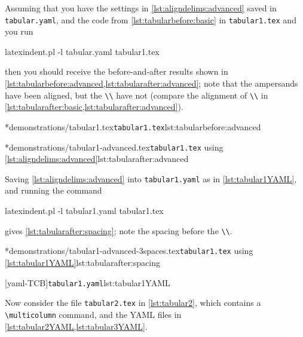 	Assuming that you have the settings in \cref{lst:aligndelims:advanced} saved in \texttt{tabular.yaml}, and the code from \cref{lst:tabularbefore:basic} in \texttt{tabular1.tex} and you run \begin{commandshell}
latexindent.pl -l tabular.yaml tabular1.tex 
\end{commandshell} then you should receive the before-and-after results shown in \cref{lst:tabularbefore:advanced,lst:tabularafter:advanced}; note that the ampersands have been aligned, but the \lstinline!\\! have not (compare the alignment of \lstinline!\\! in \cref{lst:tabularafter:basic,lst:tabularafter:advanced}).

	\begin{minipage}{.45\textwidth}
		\cmhlistingsfromfile[showspaces=false,showtabs=false]*{demonstrations/tabular1.tex}{\texttt{tabular1.tex}}{lst:tabularbefore:advanced}
	\end{minipage}%
	\hfill
	\begin{minipage}{.45\textwidth}
		\cmhlistingsfromfile[showspaces=false,showtabs=false]*{demonstrations/tabular1-advanced.tex}{\texttt{tabular1.tex} using \cref{lst:aligndelims:advanced}}{lst:tabularafter:advanced}
	\end{minipage}%

	Saving \cref{lst:aligndelims:advanced} into \texttt{tabular1.yaml} as in \cref{lst:tabular1YAML}, and running the command \begin{commandshell}
latexindent.pl -l tabular1.yaml tabular1.tex 
\end{commandshell} gives \cref{lst:tabularafter:spacing}; note the spacing before the \lstinline!\\!.

	\begin{minipage}{.45\textwidth}
		\cmhlistingsfromfile[showspaces=false,showtabs=false]*{demonstrations/tabular1-advanced-3spaces.tex}{\texttt{tabular1.tex} using \cref{lst:tabular1YAML}}{lst:tabularafter:spacing}
	\end{minipage}%
	\hfill
	\begin{minipage}{.54\textwidth}
		[yaml-TCB]{\texttt{tabular1.yaml}}{lst:tabular1YAML}
	\end{minipage}%

	Now consider the file \texttt{tabular2.tex} in \cref{lst:tabular2}, which contains a \lstinline!\multicolumn! command, and the YAML files in \cref{lst:tabular2YAML,lst:tabular3YAML}.

